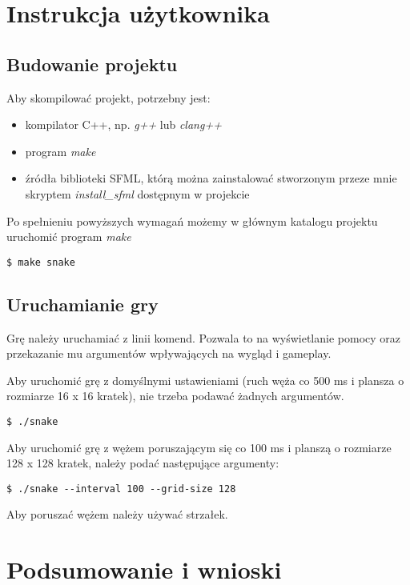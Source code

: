 \documentclass[12pt]{article}
\begin{document}
\section{Instrukcja użytkownika}

\subsection{Budowanie projektu}
Aby skompilować projekt, potrzebny jest:
\begin{itemize}
      \item kompilator C++, np. \textit{g++} lub \textit{clang++}

      \item program \textit{make}

      \item źródła biblioteki SFML, którą można zainstalować stworzonym przeze
            mnie skryptem \textit{install\_sfml} dostępnym w projekcie
\end{itemize}

Po spełnieniu powyższych wymagań możemy w głównym katalogu projektu uruchomić
program \textit{make}


\begin{lstlisting}
$ make snake
\end{lstlisting}

\subsection{Uruchamianie gry}

Grę należy uruchamiać z linii komend. Pozwala to na wyświetlanie pomocy oraz
przekazanie mu argumentów wpływających na wygląd i gameplay.

Aby uruchomić grę z domyślnymi ustawieniami (ruch węża co 500 ms i plansza o
rozmiarze 16 x 16 kratek), nie trzeba podawać żadnych argumentów.


\begin{lstlisting}
$ ./snake
\end{lstlisting}

Aby uruchomić grę z wężem poruszającym się co 100 ms i planszą o rozmiarze 128 x
128 kratek, należy podać następujące argumenty:

\begin{lstlisting}
$ ./snake --interval 100 --grid-size 128
\end{lstlisting}

Aby poruszać wężem należy używać strzałek.

\section{Podsumowanie i wnioski}
\end{document}
